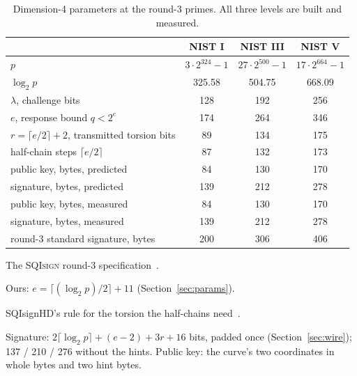 \documentclass[version=preprint]{iacrcc}
\newcommand{\SQIsign}{SQI{\textsc{sign}}}
\begin{document}
    \begin{table}[t]
        \centering
        \begin{threeparttable}
            \caption{Dimension-4 parameters at the round-3 primes. All three levels
                are built and measured.}
            \label{tab:params}
            \begin{tabular}{l c c c}
                \toprule
                & NIST I & NIST III & NIST V \\
                \midrule
                $p$\tnote{a} & $3 \cdot 2^{324} - 1$ & $27 \cdot 2^{500} - 1$ & $17 \cdot 2^{664} - 1$ \\
                $\log_2 p$\tnote{a} & 325.58 & 504.75 & 668.09 \\
                $\lambda$, challenge bits\tnote{a} & 128 & 192 & 256 \\
                $e$, response bound $q < 2^e$\tnote{b} & 174 & 264 & 346 \\
                $r = \lceil e/2 \rceil + 2$, transmitted torsion bits\tnote{c} & 89 & 134 & 175 \\
                half-chain steps $\lceil e/2 \rceil$\tnote{c} & 87 & 132 & 173 \\
                \addlinespace
                public key, bytes, predicted\tnote{d} & 84 & 130 & 170 \\
                signature, bytes, predicted\tnote{d} & 139 & 212 & 278 \\
                
                public key, bytes, measured & 84 & 130 & 170 \\
                signature, bytes, measured & 139 & 212 & 278 \\
                round-3 standard signature, bytes\tnote{a} & 200 & 306 & 406 \\
                \bottomrule
            \end{tabular}
            \begin{tablenotes}\footnotesize
                \item[a] The {\SQIsign} round-3 specification~\cite{AAA+26}.
                \item[b] Ours: $e = \lceil (\log_2 p)/2 \rceil + 11$ (Section~\ref{sec:params}).
                \item[c] SQIsignHD's rule for the torsion the half-chains need~\cite[Section 4.3]{DLRW24}.
                \item[d] Signature: $2 \lceil \log_2 p \rceil + (e - 2) + 3r + 16$ bits, padded once (Section~\ref{sec:wire}); 137 / 210 / 276 without the hints. Public key: the curve's two coordinates in whole bytes and two hint bytes.
            \end{tablenotes}
        \end{threeparttable}
    \end{table}
\end{document}
